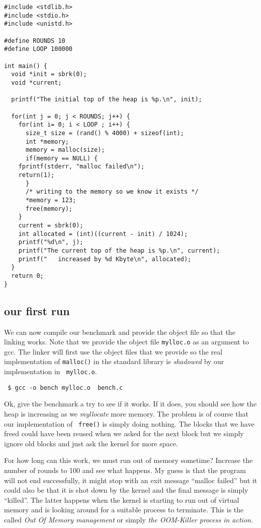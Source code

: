 \documentclass[a4paper,11pt]{article}
\begin{document}
\begin{lstlisting}
#include <stdlib.h>
#include <stdio.h>
#include <unistd.h>

#define ROUNDS 10
#define LOOP 100000

int main() {
  void *init = sbrk(0);
  void *current;

  printf("The initial top of the heap is %p.\n", init);  

  for(int j = 0; j < ROUNDS; j++) {
    for(int i= 0; i < LOOP ; i++) {
      size_t size = (rand() % 4000) + sizeof(int);
      int *memory; 
      memory = malloc(size);
      if(memory == NULL) {
	fprintf(stderr, "malloc failed\n");
	return(1);
      }
      /* writing to the memory so we know it exists */
      *memory = 123;
      free(memory);
    }
    current = sbrk(0);
    int allocated = (int)((current - init) / 1024);
    printf("%d\n", j);
    printf("The current top of the heap is %p.\n", current);
    printf("   increased by %d Kbyte\n", allocated);
  }
  return 0;
}
\end{lstlisting}

\subsection{our first run}

We can now compile our benchmark and provide the object file so that
the linking works. Note that we provide the object file {\tt mylloc.o}
as an argument to gcc. The linker will first use the object files that
we provide so the real implementation of {\tt malloc()} in the
standard library is {\em shadowed} by our implementation in {\tt
  mylloc.o}.

\begin{verbatim}
 $ gcc -o bench mylloc.o  bench.c 
\end{verbatim}

Ok, give the benchmark a try to see if it works. If it does, you
should see how the heap is increasing as we {\em myllocate} more
memory. The problem is of course that our implementation of {\tt
  free()} is simply doing nothing. The blocks that we have freed
could have been reused when we asked for the next block but we simply
ignore old blocks and just ask the kernel for more space.

For how long can this work, we must run out of memory sometime?
Increase the number of rounds to 100 and see what happens. My
guess is that the program will not end successfully, it might stop with an
exit message ``malloc failed'' but it could also be that
it is shot down by the kernel and the final message is simply
``killed''. The latter happens when the kernel is starting to run out
of virtual memory and is looking around for a suitable process to
terminate. This is the called {\em Out Of Memory management} or simply
{\em the OOM-Killer process in action}.
\end{document}
